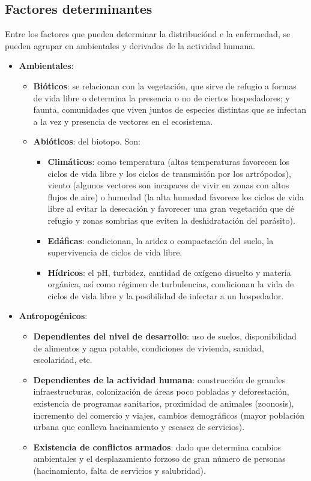 \documentclass[10pt,a4paper,onecolumn,openany]{book}
\begin{document}
\subsection{Factores determinantes}
Entre los factores que pueden determinar la distribuciónd e la enfermedad, se pueden agrupar en ambientales y derivados de la actividad humana.
\begin{itemize}[itemsep=0pt,parsep=0pt,topsep=0pt,partopsep=0pt]
	\item \textbf{Ambientales}:
	\begin{itemize}[itemsep=0pt,parsep=0pt,topsep=0pt,partopsep=0pt]
		\item \textbf{Bióticos}: se relacionan con la vegetación, que sirve de refugio a formas de vida libre o determina la presencia o no de ciertos hospedadores; y faunta, comunidades que viven juntos de especies distintas que se infectan a la vez y presencia de vectores en el ecosistema.
		\item\textbf{Abióticos}: del biotopo. Son:
		\begin{itemize}[itemsep=0pt,parsep=0pt,topsep=0pt,partopsep=0pt]
			\item \textbf{Climáticos}: como temperatura (altas temperaturas favorecen los ciclos de vida libre y los ciclos de transmisión por los artrópodos), viento (algunos vectores son incapaces de vivir en zonas con altos flujos de aire) o humedad (la alta humedad favorece los ciclos de vida libre al evitar la desecación y favorecer una gran vegetación que dé refugio y zonas sombrias que eviten la deshidratación del parásito).
			\item\textbf{Edáficas}: condicionan, la aridez o compactación del suelo, la supervivencia de ciclos de vida libre.
			\item\textbf{Hídricos}: el pH, turbidez, cantidad de oxígeno disuelto y materia orgánica, así como régimen de turbulencias, condicionan la vida de ciclos de vida libre y la posibilidad de infectar a un hospedador.
		\end{itemize}
	\end{itemize}
	\item\textbf{Antropogénicos}:
	\begin{itemize}[itemsep=0pt,parsep=0pt,topsep=0pt,partopsep=0pt]
		\item \textbf{Dependientes del nivel de desarrollo}: uso de suelos, disponibilidad de alimentos y agua potable, condiciones de vivienda, sanidad, escolaridad, etc.
		\item\textbf{Dependientes de la actividad humana}: construcción de grandes infraestructuras, colonización de áreas poco pobladas y deforestación, existencia de programas sanitarios, proximidad de animales (zoonosis), incremento del comercio y viajes, cambios demográficos (mayor población urbana que conlleva hacinamiento y escasez de servicios).
		\item\textbf{Existencia de conflictos armados}: dado que determina cambios ambientales y el desplazamiento forzoso de gran número de personas (hacinamiento, falta de servicios y salubridad).
	\end{itemize}
\end{itemize}
\end{document}
